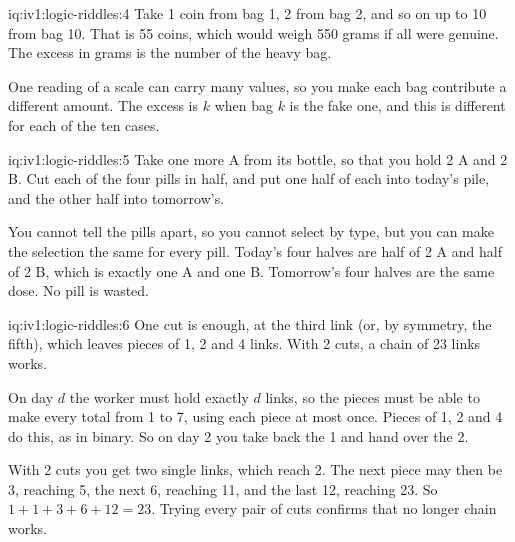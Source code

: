 \begin{solution}{iq:iv1:logic-riddles:4}
Take 1 coin from bag 1, 2 from bag 2, and so on up to 10 from bag 10. That is 55 coins, which would weigh 550 grams if all were genuine. The excess in grams is the number of the heavy bag.

One reading of a scale can carry many values, so you make each bag contribute a different amount. The excess is $k$ when bag $k$ is the fake one, and this is different for each of the ten cases.

\end{solution}

\begin{solution}{iq:iv1:logic-riddles:5}
Take one more A from its bottle, so that you hold 2 A and 2 B. Cut each of the four pills in half, and put one half of each into today's pile, and the other half into tomorrow's.

You cannot tell the pills apart, so you cannot select by type, but you can make the selection the same for every pill. Today's four halves are half of 2 A and half of 2 B, which is exactly one A and one B. Tomorrow's four halves are the same dose. No pill is wasted.

\end{solution}

\begin{solution}{iq:iv1:logic-riddles:6}
One cut is enough, at the third link (or, by symmetry, the fifth), which leaves pieces of 1, 2 and 4 links. With 2 cuts, a chain of 23 links works.

On day $d$ the worker must hold exactly $d$ links, so the pieces must be able to make every total from 1 to 7, using each piece at most once. Pieces of 1, 2 and 4 do this, as in binary. So on day 2 you take back the 1 and hand over the 2.

With 2 cuts you get two single links, which reach 2. The next piece may then be 3, reaching 5, the next 6, reaching 11, and the last 12, reaching 23. So $1 + 1 + 3 + 6 + 12 = 23$. Trying every pair of cuts confirms that no longer chain works.

\end{solution}

